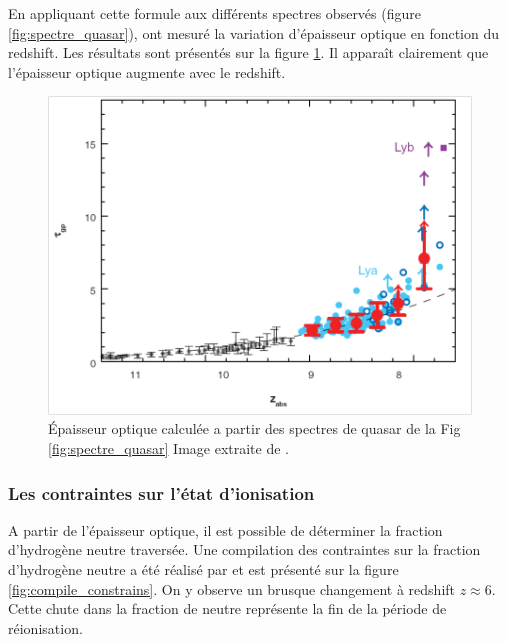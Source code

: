 En appliquant cette formule aux différents spectres observés (figure \ref{fig:spectre_quasar}), \cite{fan_constraining_2006} ont mesuré la variation d'épaisseur optique en fonction du redshift.
Les résultats sont présentés sur la figure \ref{fig:epaisseur_optique_quasar}.
Il apparaît clairement que l'épaisseur optique augmente avec le redshift.

\begin{figure}
        \includegraphics[width=.95\linewidth]{img/01/epaisseur_optique_quasar.png} 
        \caption[Epaisseur optique Lyman alpha]{%
		Épaisseur optique calculée a partir des spectres de quasar de la Fig\,\ref{fig:spectre_quasar}
        Image extraite de \cite{fan_constraining_2006}.}
 		\label{fig:epaisseur_optique_quasar}
\end{figure}

\subsubsection{Les contraintes sur l'état d'ionisation}

A partir de l'épaisseur optique, il est possible de déterminer la fraction d'hydrogène neutre traversée.
Une compilation des contraintes sur la fraction d'hydrogène neutre a été réalisé par \cite{2015ApJ...811..140B} et est présenté sur la figure \ref{fig:compile_constrains}.
On y observe un brusque changement à redshift $z\approx6$.
Cette chute dans la fraction de neutre représente la fin de la période de réionisation.

